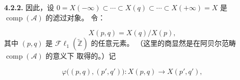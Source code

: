 \noindent\textbf{4.2.2.}\quad
因此，设
$0=X(-\infty)\subset\cdots\subset X(q)\subset\cdots\subset
X(+\infty)=X$ 是 $\operatorname{comp}(\mathcal A)$ 的滤过对象。
令：

\begin{equation}
X(p,q)=X(q)/X(p),
\tag{4.2.2.1}
\end{equation}
其中 $(p,q)$ 是 $\mathcal{F}\ell_1(\widetilde{\mathbb Z})$ 的任意元素。
（这里的商显然是在阿贝尔范畴 $\operatorname{comp}(\mathcal A)$ 的意义下
取得的。）记

\begin{equation}
\varphi\bigl((p,q),(p',q')\bigr)\colon
X(p,q)\longrightarrow X(p',q'),
\tag{4.2.2.2}
\end{equation}
\endgroup
